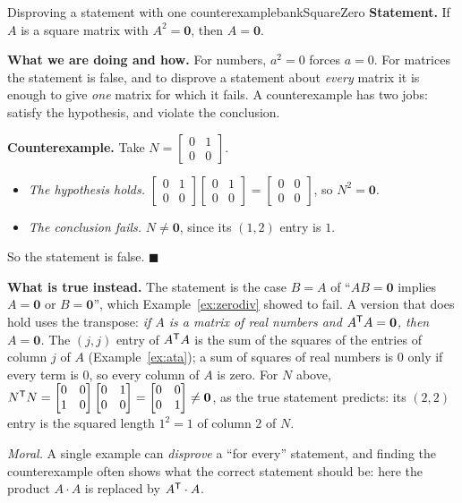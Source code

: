 \documentclass[11pt]{article}
\begin{document}
\begin{exmp}{Disproving a statement with one counterexample}{bankSquareZero}
\textbf{Statement.} If $A$ is a square matrix with $A^2=\mathbf{0}$, then $A=\mathbf{0}$.

\textbf{What we are doing and how.} For numbers, $a^2=0$ forces $a=0$. For matrices the statement is false, and to disprove a statement about \emph{every} matrix it is enough to give \emph{one} matrix for which it fails. A counterexample has two jobs: satisfy the hypothesis, and violate the conclusion.

\textbf{Counterexample.} Take $N=\begin{bmatrix}0&1\\0&0\end{bmatrix}$.
\begin{itemize}
  \item \emph{The hypothesis holds.} $\begin{bmatrix}0&1\\0&0\end{bmatrix}\begin{bmatrix}0&1\\0&0\end{bmatrix}=\begin{bmatrix}0&0\\0&0\end{bmatrix}$, so $N^2=\mathbf{0}$.
  \item \emph{The conclusion fails.} $N\neq\mathbf{0}$, since its $(1,2)$ entry is $1$.
\end{itemize}
So the statement is false. \qquad$\blacksquare$

\textbf{What is true instead.} The statement is the case $B=A$ of ``$AB=\mathbf{0}$ implies $A=\mathbf{0}$ or $B=\mathbf{0}$'', which Example~\ref{ex:zerodiv} showed to fail. A version that does hold uses the transpose: \emph{if $A$ is a matrix of real numbers and $A^{\mathsf T} A=\mathbf{0}$, then $A=\mathbf{0}$.} The $(j,j)$ entry of $A^{\mathsf T} A$ is the sum of the squares of the entries of column $j$ of $A$ (Example~\ref{ex:ata}); a sum of squares of real numbers is $0$ only if every term is $0$, so every column of $A$ is zero. For $N$ above, $N^{\mathsf T} N=\begin{bmatrix}0&0\\1&0\end{bmatrix}\begin{bmatrix}0&1\\0&0\end{bmatrix}=\begin{bmatrix}0&0\\0&1\end{bmatrix}\neq\mathbf{0}$, as the true statement predicts: its $(2,2)$ entry is the squared length $1^2=1$ of column $2$ of $N$.

\emph{Moral.} A single example can \emph{disprove} a ``for every'' statement, and finding the counterexample often shows what the correct statement should be: here the product $A\cdot A$ is replaced by $A^{\mathsf T}\cdot A$.
\end{exmp}
\end{document}
